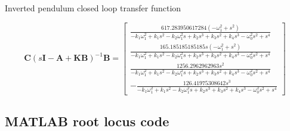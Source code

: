 \documentclass{article}
\begin{document}
Inverted pendulum closed loop transfer function

\begin{equation}
  \mathbf{C} (s\mathbf{I} - \mathbf{A} + \mathbf{KB}) ^{-1} \mathbf{B} = \left[\begin{matrix}\frac{617.283950617284 \left(- \omega_{1}^{2} + s^{2}\right)}{- k_{1} \omega_{1}^{2} + k_{1} s^{2} - k_{2} \omega_{1}^{2} s + k_{2} s^{3} + k_{3} s^{2} + k_{4} s^{3} - \omega_{0}^{2} s^{2} + s^{4}}\\\frac{165.185185185185 s \left(- \omega_{1}^{2} + s^{2}\right)}{- k_{1} \omega_{1}^{2} + k_{1} s^{2} - k_{2} \omega_{1}^{2} s + k_{2} s^{3} + k_{3} s^{2} + k_{4} s^{3} - \omega_{0}^{2} s^{2} + s^{4}}\\\frac{1256.2962962963 s^{2}}{- k_{1} \omega_{1}^{2} + k_{1} s^{2} - k_{2} \omega_{1}^{2} s + k_{2} s^{3} + k_{3} s^{2} + k_{4} s^{3} - \omega_{0}^{2} s^{2} + s^{4}}\\- \frac{126.41975308642 s^{3}}{- k_{1} \omega_{1}^{2} + k_{1} s^{2} - k_{2} \omega_{1}^{2} s + k_{2} s^{3} + k_{3} s^{2} + k_{4} s^{3} - \omega_{0}^{2} s^{2} + s^{4}}\end{matrix}\right]
\end{equation}


\subsection{MATLAB root locus code}
\end{document}

